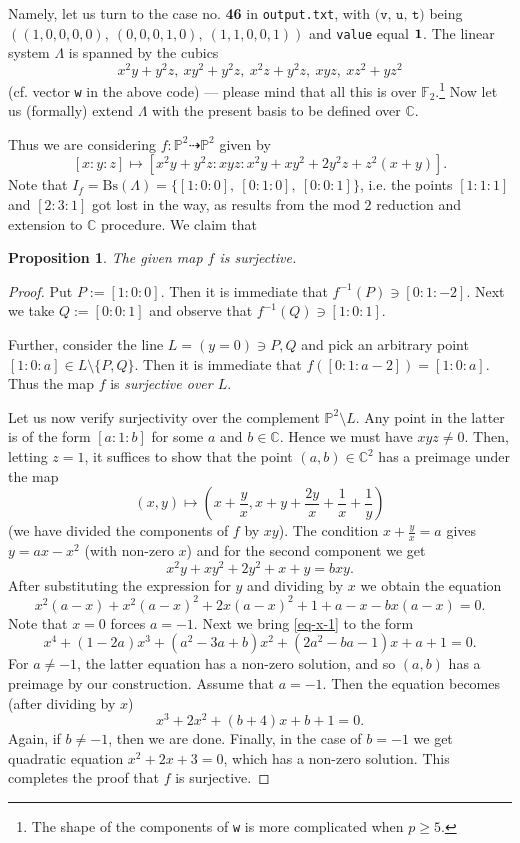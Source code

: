 \documentclass[14pt]{amsart}
\newtheorem{prop}[equation]{Proposition}
\theoremstyle{definition}
\theoremstyle{remark}
\newcommand{\com}{\mathbb{C}}
\newcommand{\p}{\mathbb{P}}
\begin{document}
Namely, let us turn to the case no. {\bf 46} in
\texttt{output.txt}, with $\texttt{(v, u, t)}$ being
$((1,0,0,0,0),\ (0,0,0,1,0),\ (1,1,0,0,1))$ and \texttt{value}
equal ${\bf 1}$. The linear system $\Lambda$ is spanned by the
cubics
$$
x^2y + y^2z,\ xy^2 + y^2z,\ x^2z + y^2z,\ xyz,\ xz^2 + yz^2
$$
(cf. vector \texttt{w} in the above code) --- please mind that all
this is over $\mathbb{F}_2$.\footnote{The shape of the components
of \texttt{w} is more complicated when $p \ge 5$.} Now let us
(formally) extend $\Lambda$ with the present basis to be defined
over $\com$.

Thus we are considering $f: \p^2 \dashrightarrow \p^2$ given by
$$
[x: y: z] \mapsto [x^2y + y^2z: xyz: x^2y + xy^2 + 2y^2z + z^2(x +
y)].
$$
Note that $I_f = \text{Bs}(\Lambda) = \{[1:0:0],\ [0:1:0],\
[0:0:1]\}$, i.e. the points $[1:1:1]$ and $[2:3:1]$ got lost in
the way, as results from the mod $2$ reduction and extension to
$\com$ procedure. We claim that

\begin{prop}
\label{theorem:4-dp-surj} The given map $f$ is surjective.
\end{prop}

\begin{proof}
Put $P := [1:0:0]$. Then it is immediate that $f^{-1}(P) \ni
[0:1:-2]$. Next we take $Q := [0:0:1]$ and observe that $f^{-1}(Q)
\ni [1:0:1]$.

Further, consider the line $L = (y = 0) \ni P,Q$ and pick an
arbitrary point $[1:0:a] \in L \setminus\{P,Q\}$. Then it is
immediate that $f([0:1:a - 2]) = [1:0:a]$. Thus the map $f$ is
\emph{surjective over $L$}.

Let us now verify surjectivity over the complement $\p^2 \setminus
L$. Any point in the latter is of the form $[a:1:b]$ for some $a$
and $b \in \com$. Hence we must have $xyz \ne 0$. Then, letting $z
= 1$, it suffices to show that the point $(a,b) \in \com^2$ has a
preimage under the map
$$
(x,y) \mapsto (x + \frac{y}{x}, x + y + \frac{2y}{x} + \frac{1}{x}
+ \frac{1}{y})
$$
(we have divided the components of $f$ by $xy$). The condition $x
+ \displaystyle\frac{y}{x} = a$ gives $y = ax - x^2$ (with
non-zero $x$) and for the second component we get
$$
x^2y + xy^2 + 2y^2 + x + y = bxy.
$$
After substituting the expression for $y$ and dividing by $x$ we
obtain the equation
\begin{equation}
\label{eq-x-1} x^2(a - x) + x^2(a - x)^2 + 2x(a - x)^2 + 1 + a - x
- bx(a - x) = 0.
\end{equation}
Note that $x = 0$ forces $a = -1$. Next we bring \eqref{eq-x-1} to
the form
$$
x^4 + (1 - 2a)x^3 + (a^2 - 3a + b)x^2 + (2a^2 - ba - 1)x + a + 1 =
0.
$$
For $a \ne -1$, the latter equation has a non-zero solution, and
so $(a,b)$ has a preimage by our construction. Assume that $a =
-1$. Then the equation becomes (after dividing by $x$)
$$
x^3 + 2x^2 + (b + 4)x + b + 1 = 0.
$$
Again, if $b \ne -1$, then we are done. Finally, in the case of $b
= -1$ we get quadratic equation $x^2 + 2x + 3 = 0$, which has a
non-zero solution. This completes the proof that $f$ is
surjective.
\end{proof}
\end{document}
